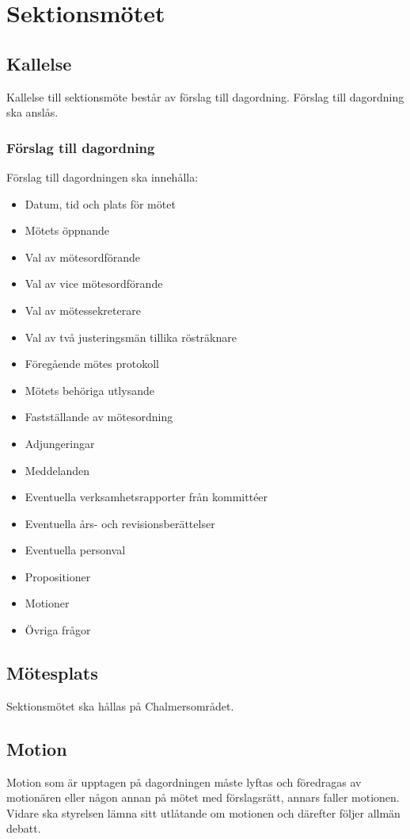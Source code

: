 \section{Sektionsmötet}

\subsection{Kallelse} 
Kallelse till sektionsmöte består av förslag till dagordning. Förslag till
dagordning ska anslås.

\subsubsection{Förslag till dagordning}
Förslag till dagordningen ska innehålla:
\begin{itemize}  
  \item Datum, tid och plats för mötet 
  \item Mötets öppnande 
  \item Val av mötesordförande
  \item Val av vice mötesordförande
  \item Val av mötessekreterare 
  \item Val av två justeringsmän tillika rösträknare 
  \item Föregående mötes protokoll
  \item Mötets behöriga utlysande 
  \item Fastställande av mötesordning 
  \item Adjungeringar 
  \item Meddelanden 
  \item Eventuella verksamhetsrapporter från kommittéer 
  \item Eventuella års- och revisionsberättelser 
  \item Eventuella personval 
  \item Propositioner 
  \item Motioner 
  \item Övriga frågor 
\end{itemize}
\subsection{Mötesplats} 
Sektionsmötet ska hållas på Chalmersområdet.
\subsection{Motion}
Motion som är upptagen på dagordningen måste lyftas och föredragas av motionären eller någon annan på mötet med förslagsrätt, annars faller motionen.
Vidare ska styrelsen lämna sitt utlåtande om motionen och därefter följer allmän debatt.
